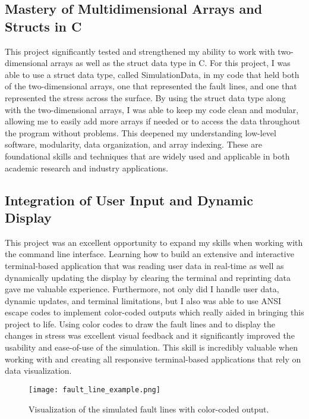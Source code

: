 \documentclass[conference]{IEEEtran}
\begin{document}
\subsection{Mastery of Multidimensional Arrays and Structs in C}
This project significantly tested and strengthened my ability to work with two-dimensional arrays as well as the struct data type in C. For this project, I was able to use a struct data type, called SimulationData, in my code that held both of the two-dimensional arrays, one that represented the fault lines, and one that represented the stress across the surface. By using the struct data type along with the two-dimensional arrays, I was able to keep my code clean and modular, allowing me to easily add more arrays if needed or to access the data throughout the program without problems. This deepened my understanding low-level software, modularity, data organization, and array indexing. These are foundational skills and techniques that are widely used and applicable in both academic research and industry applications.



\subsection{Integration of User Input and Dynamic Display}\label{AA}
This project was an excellent opportunity to expand my skills when working with the command line interface. Learning how to build an extensive and interactive terminal-based application that was reading user data in real-time as well as dynamically updating the display by clearing the terminal and reprinting data gave me valuable experience. Furthermore, not only did I handle user data, dynamic updates, and terminal limitations, but I also was able to use ANSI escape codes to implement color-coded outputs which really aided in bringing this project to life. Using color codes to draw the fault lines and to display the changes in stress was excellent visual feedback and it significantly improved the usability and ease-of-use of the simulation. This skill is incredibly valuable when working with and creating all responsive terminal-based applications that rely on data visualization. 

\begin{figure}[H]
    \centering
    \texttt{[image: fault\_line\_example.png]}
    \caption{Visualization of the simulated fault lines with color-coded output.}
    \label{fig:faultlines}
\end{figure}
\end{document}

